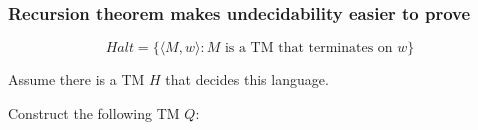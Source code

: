 \documentclass{beamer}
\newcommand{\bfr}[1]{\begin{frame}[fragile]\frametitle{{ #1 }}}
\begin{document}
\bfr{Recursion theorem makes undecidability easier to prove}
\[
Halt = \{ \langle M,w\rangle : \mbox{$M$ is a TM that terminates on $w$}\}
\]

Assume there is a TM $H$ that decides this language.

Construct the following TM $Q$:

\centerline{}

\end{frame}
\end{document}
